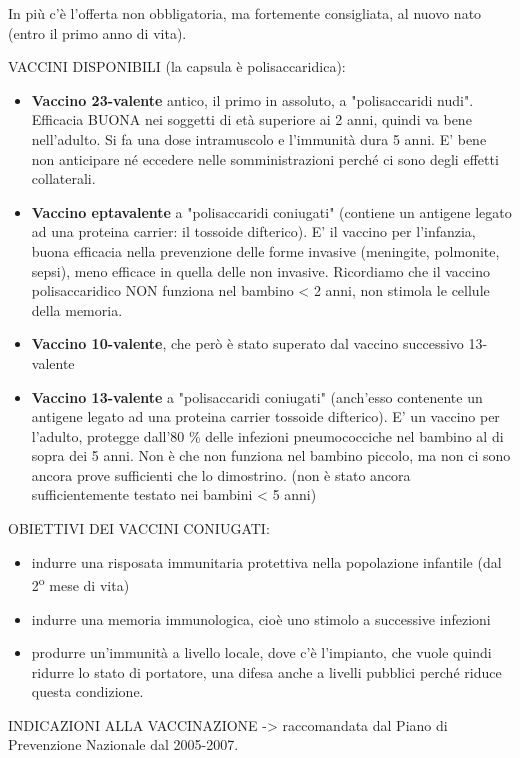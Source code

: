   In più c'è l'offerta non obbligatoria, ma fortemente consigliata, al
  nuovo nato (entro il primo anno di vita).

  VACCINI DISPONIBILI (la capsula è polisaccaridica):

\begin{itemize}
\item
  \textbf{Vaccino 23-valente} antico, il primo in assoluto, a
  "polisaccaridi nudi". Efficacia BUONA nei soggetti di età superiore ai
  2 anni, quindi va bene nell'adulto. Si fa una dose intramuscolo e
  l'immunità dura 5 anni. E' bene non anticipare né eccedere nelle
  somministrazioni perché ci sono degli effetti collaterali.

\item
  \textbf{Vaccino eptavalente} a "polisaccaridi coniugati" (contiene un
  antigene legato ad una proteina carrier: il tossoide difterico). E' il
  vaccino per l'infanzia, buona efficacia nella prevenzione delle forme
  invasive (meningite, polmonite, sepsi), meno efficace in quella delle
  non invasive. Ricordiamo che il vaccino polisaccaridico NON funziona
  nel bambino < 2 anni, non stimola le cellule della memoria.
\item
  \textbf{Vaccino 10-valente}, che però è stato superato dal vaccino
  successivo 13-valente
\item
  \textbf{Vaccino 13-valente} a "polisaccaridi coniugati" (anch'esso
  contenente un antigene legato ad una proteina carrier tossoide
  difterico). E' un vaccino per l'adulto, protegge dall'80 \% delle
  infezioni pneumococciche nel bambino al di sopra dei 5 anni. Non è che
  non funziona nel bambino piccolo, ma non ci sono ancora prove
  sufficienti che lo dimostrino. (non è stato ancora sufficientemente
  testato nei bambini < 5 anni)
\end{itemize}

  OBIETTIVI DEI VACCINI CONIUGATI:
\begin{itemize}
\item indurre una risposata immunitaria protettiva nella popolazione
  infantile (dal 2\textsuperscript{o} mese di vita)
\item indurre una memoria immunologica, cioè uno stimolo a successive
  infezioni
\item produrre un'immunità a livello locale, dove c'è l'impianto, che
  vuole quindi ridurre lo stato di portatore, una difesa anche a livelli
  pubblici perché riduce questa condizione.
\end{itemize}
  INDICAZIONI ALLA VACCINAZIONE -> raccomandata dal Piano di Prevenzione
  Nazionale dal 2005-2007.

